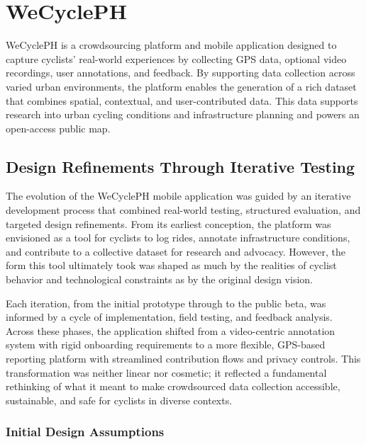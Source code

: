 %
%
%                 
\chapter{WeCyclePH}

WeCyclePH is a crowdsourcing platform and mobile application designed to capture cyclists' real-world experiences by collecting GPS data, optional video recordings, user annotations, and feedback. By supporting data collection across varied urban environments, the platform enables the generation of a rich dataset that combines spatial, contextual, and user-contributed data. This data supports research into urban cycling conditions and infrastructure planning and powers an open-access public map.

\section{Design Refinements Through Iterative Testing}

The evolution of the WeCyclePH mobile application was guided by an iterative development process that combined real-world testing, structured evaluation, and targeted design refinements. From its earliest conception, the platform was envisioned as a tool for cyclists to log rides, annotate infrastructure conditions, and contribute to a collective dataset for research and advocacy. However, the form this tool ultimately took was shaped as much by the realities of cyclist behavior and technological constraints as by the original design vision.

Each iteration, from the initial prototype through to the public beta, was informed by a cycle of implementation, field testing, and feedback analysis. Across these phases, the application shifted from a video-centric annotation system with rigid onboarding requirements to a more flexible, GPS-based reporting platform with streamlined contribution flows and privacy controls. This transformation was neither linear nor cosmetic; it reflected a fundamental rethinking of what it meant to make crowdsourced data collection accessible, sustainable, and safe for cyclists in diverse contexts.


\subsection{Initial Design Assumptions}

